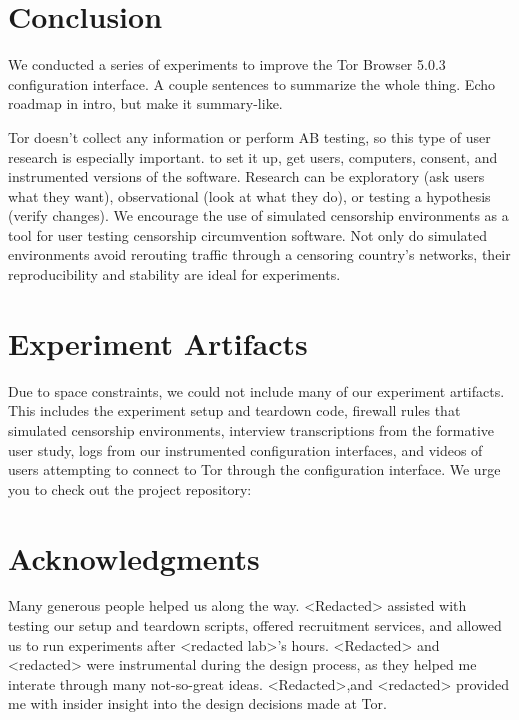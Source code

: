 \documentclass[USenglish,oneside,twocolumn]{article}
\begin{document}
\section{Conclusion} 
\label{sec:conclusion}

{\color {blue}
We conducted a series of experiments to improve the Tor Browser 5.0.3 configuration interface. A couple sentences to summarize the whole thing. Echo roadmap in intro, but make it summary-like. 

Tor doesn't collect any information or perform AB testing, so this type of user research is especially important. to set it up, get users, computers, consent, and instrumented versions of the software. Research can be exploratory (ask users what they want), observational (look at what they do), or testing a hypothesis (verify changes). We encourage the use of simulated censorship environments as a tool for user testing censorship circumvention software. Not only do simulated environments avoid rerouting traffic through a censoring country's networks, their reproducibility and stability are ideal for experiments. 
}

\section {Experiment Artifacts} 
Due to space constraints, we could not include many of our experiment artifacts. This includes the experiment setup and teardown code, firewall rules that simulated censorship environments, interview transcriptions from the formative user study, logs from our instrumented configuration interfaces, and videos of users attempting to connect to Tor through the configuration interface. We urge you to check out the project repository: \\


\section {Acknowledgments}
Many generous people helped us along the way. <Redacted> assisted with testing our setup and teardown scripts, offered recruitment services, and allowed us to run experiments after <redacted lab>'s hours. <Redacted> and <redacted> were instrumental during the design process, as they helped me interate through many not-so-great ideas.  <Redacted>,and <redacted> provided me with insider insight into the design decisions made at Tor.
\end{document}
